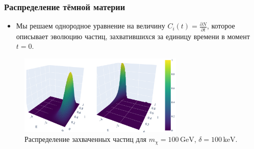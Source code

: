 \documentclass[
11pt,]{beamer}
\newcommand{\deriv}[2]{\frac{\partial #1}{\partial #2}}
\begin{document}
	\begin{frame}
		\frametitle{Распределение тёмной материи}
		\begin{itemize}
	\item Мы решаем однородное уравнение на величину $C_i(t) = \deriv{N}{t}$, которое описывает эволюцию частиц, захватившихся за единицу времени в момент $t=0$.
\end{itemize}

\begin{figure}
	\centering
	\includegraphics[width=0.7\textwidth]
	{images/Capt100_100.png}
	\caption{Распределение захваченных частиц для $m_{\chi} = 100\, \text{GeV}$, $\delta = 100\, \text{keV}$.}
\end{figure}
	\end{frame}
	
	
\end{document}
